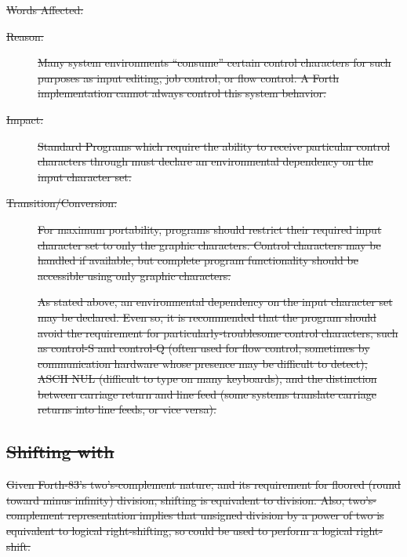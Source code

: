 \begin{description}
\item[\sout{Words Affected:}]
\sout{}

\item[\sout{Reason:}]
\sout{%
	Many system environments ``consume'' certain control characters
	for such purposes as input editing, job control, or flow control.
	A Forth implementation cannot always control this system behavior.}

\item[\sout{Impact:}]
\sout{%
	Standard Programs which require the ability to receive particular
	control characters through  must declare an environmental
	dependency on the input character set.}

\item[\sout{Transition/Conversion:}]
\sout{%
	For maximum portability, programs should restrict their required
	input character set to only the graphic characters. Control
	characters may be handled if available, but complete program
	functionality should be accessible using only graphic characters.}

\sout{%
	As stated above, an environmental dependency on the input character
	set may be declared. Even so, it is recommended that the program
	should avoid the requirement for particularly-troublesome control
	characters, such as control-S and control-Q (often used for flow
	control, sometimes by communication hardware whose presence may be
	difficult to detect), ASCII NUL (difficult to type on many keyboards),
	and the distinction between carriage return and line feed (some
	systems translate carriage returns into line feeds, or vice versa).}
\end{description}


\subsection[Shifting with UM/MOD]{\sout{Shifting with }} %

\sout{%
Given Forth-83's two's-complement nature, and its requirement for
floored (round toward minus infinity) division, shifting is equivalent
to division. Also, two's-complement representation implies that
unsigned division by a power of two is equivalent to logical
right-shifting, so  could be used to perform a logical
right-shift.}

